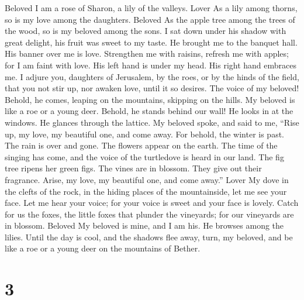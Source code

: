 Beloved  I am a rose of Sharon, a lily of the valleys.
Lover  As a lily among thorns, so is my love among the
daughters. Beloved  As the apple tree among the trees of
the wood, so is my beloved among the sons. I sat down under his shadow
with great delight, his fruit was sweet to my taste.  He
brought me to the banquet hall. His banner over me is love.
 Strengthen me with raisins, refresh me with apples; for I
am faint with love.  His left hand is under my head. His
right hand embraces me.  I adjure you, daughters of
Jerusalem, by the roes, or by the hinds of the field, that you not stir
up, nor awaken love, until it so desires.  The voice of my
beloved! Behold, he comes, leaping on the mountains, skipping on the
hills.  My beloved is like a roe or a young deer. Behold,
he stands behind our wall! He looks in at the windows. He glances
through the lattice.  My beloved spoke, and said to me,
``Rise up, my love, my beautiful one, and come away.  For
behold, the winter is past. The rain is over and gone. 
The flowers appear on the earth. The time of the singing has come, and
the voice of the turtledove is heard in our land.  The
fig tree ripens her green figs. The vines are in blossom. They give out
their fragrance. Arise, my love, my beautiful one, and come away.''
Lover  My dove in the clefts of the rock, in the hiding
places of the mountainside, let me see your face. Let me hear your
voice; for your voice is sweet and your face is lovely. 
Catch for us the foxes, the little foxes that plunder the vineyards; for
our vineyards are in blossom. Beloved  My beloved is
mine, and I am his. He browses among the lilies.  Until
the day is cool, and the shadows flee away, turn, my beloved, and be
like a roe or a young deer on the mountains of Bether.

\hypertarget{section-2}{%
\section{3}\label{section-2}}

